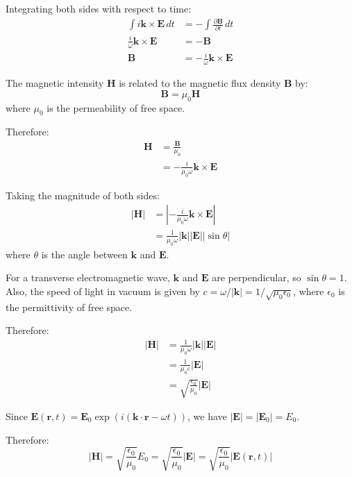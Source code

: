 \documentclass{article}
\begin{document}
Integrating both sides with respect to time:
\begin{align*}
\int i \mathbf{k} \times \mathbf{E} \, dt &= -\int \frac{\partial \mathbf{B}}{\partial t} \, dt \\
\frac{i}{\omega} \mathbf{k} \times \mathbf{E} &= -\mathbf{B} \\
\mathbf{B} &= -\frac{i}{\omega} \mathbf{k} \times \mathbf{E}
\end{align*}

The magnetic intensity $\mathbf{H}$ is related to the magnetic flux density $\mathbf{B}$ by:
\begin{equation*}
\mathbf{B} = \mu_0 \mathbf{H}
\end{equation*}
where $\mu_0$ is the permeability of free space.

Therefore:
\begin{align*}
\mathbf{H} &= \frac{\mathbf{B}}{\mu_0} \\
&= -\frac{i}{\mu_0 \omega} \mathbf{k} \times \mathbf{E}
\end{align*}

Taking the magnitude of both sides:
\begin{align*}
|\mathbf{H}| &= \left| -\frac{i}{\mu_0 \omega} \mathbf{k} \times \mathbf{E} \right| \\
&= \frac{1}{\mu_0 \omega} |\mathbf{k}| |\mathbf{E}| |\sin \theta|
\end{align*}
where $\theta$ is the angle between $\mathbf{k}$ and $\mathbf{E}$.

For a transverse electromagnetic wave, $\mathbf{k}$ and $\mathbf{E}$ are perpendicular, so $\sin \theta = 1$. Also, the speed of light in vacuum is given by $c = \omega/|\mathbf{k}| = 1/\sqrt{\mu_0 \epsilon_0}$, where $\epsilon_0$ is the permittivity of free space.

Therefore:
\begin{align*}
|\mathbf{H}| &= \frac{1}{\mu_0 \omega} |\mathbf{k}| |\mathbf{E}| \\
&= \frac{1}{\mu_0 c} |\mathbf{E}| \\
&= \sqrt{\frac{\epsilon_0}{\mu_0}} |\mathbf{E}|
\end{align*}

Since $\mathbf{E}(\mathbf{r}, t) = \mathbf{E}_0 \exp(i (\mathbf{k} \cdot \mathbf{r} - \omega t))$, we have $|\mathbf{E}| = |\mathbf{E}_0| = E_0$.

Therefore:
\begin{equation*}
|\mathbf{H}| = \sqrt{\frac{\epsilon_0}{\mu_0}} E_0 = \sqrt{\frac{\epsilon_0}{\mu_0}} |\mathbf{E}| = \sqrt{\frac{\epsilon_0}{\mu_0}} |\mathbf{E}(\mathbf{r}, t)|
\end{equation*}
\end{document}
